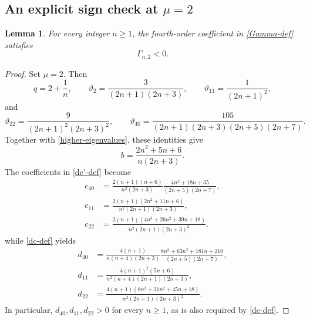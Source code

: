 \documentclass[11pt]{article}
\newtheorem{lemma}{Lemma}[section]
\begin{document}
\subsection{\texorpdfstring{{An explicit sign check at $\mu=2$}}{An explicit sign check at mu=2}}
\begin{lemma}\label{Gamma-mu-two}
For every integer $n\ge1$, the fourth-order coefficient in \eqref{Gamma-def} satisfies
\[
 \Gamma_{n,2}<0.
\]
\end{lemma}
\begin{proof}
Set $\mu=2$. Then
\[
 q=2+\frac1n,
 \qquad
 \vartheta_2=\frac{3}{(2n+1)(2n+3)},
 \qquad
 \vartheta_{11}=\frac{1}{(2n+1)^2},
\]
and
\[
 \vartheta_{22}=\frac{9}{(2n+1)^2(2n+3)^2},
 \qquad
 \vartheta_{40}=\frac{105}{(2n+1)(2n+3)(2n+5)(2n+7)}.
\]
Together with \eqref{higher-eigenvalues}, these identities give
\begin{equation}\label{Gamma2-b}
 b=\frac{2n^2+5n+6}{n(2n+3)}.
\end{equation}
The coefficients in \eqref{dc'-def} become
\begin{equation}\label{Gamma2-c}
\begin{aligned}
 c_{40}&=\frac{2(n+1)(n+6)}{n^2(2n+3)}
 \frac{4n^2+18n+35}{(2n+5)(2n+7)},\\
 c_{11}&=\frac{2(n+1)(2n^2+11n+6)}
 {n^2(2n+1)(2n+3)},\\
 c_{22}&=\frac{2(n+1)(4n^3+26n^2+39n+18)}
 {n^2(2n+1)(2n+3)^2}.
\end{aligned}
\end{equation}
while \eqref{dc-def} yields
\begin{equation}\label{Gamma2-d}
\begin{aligned}
 d_{40}&=\frac{4(n+1)}{n(n+4)(2n+3)}
 \frac{8n^3+63n^2+181n+210}{(2n+5)(2n+7)},\\
 d_{11}&=\frac{4(n+1)^2(5n+6)}
 {n^2(n+4)(2n+1)(2n+3)},\\
 d_{22}&=\frac{4(n+1)(8n^3+31n^2+45n+18)}
 {n^2(2n+1)(2n+3)^2}.
\end{aligned}
\end{equation}
In particular, $d_{40},d_{11},d_{22}>0$ for every $n\ge1$, as is also required by \eqref{dc-def}.


\end{proof}
\end{document}
